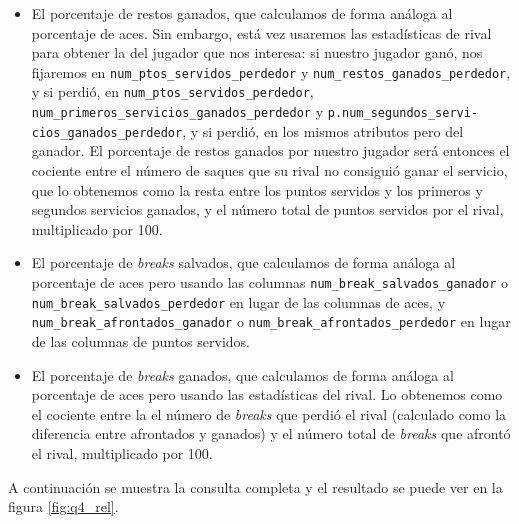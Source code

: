 \documentclass[11pt]{opticajnl}
\begin{document}
\begin{itemize}
\item El porcentaje de restos ganados, que calculamos de forma análoga al porcentaje de aces. Sin embargo, está vez usaremos las estadísticas de rival para obtener la del jugador que nos interesa: si nuestro jugador ganó, nos fijaremos en \texttt{num\_ptos\_servidos\_perdedor} y \texttt{num\_restos\_ganados\_perdedor}, y si perdió, en \texttt{num\_ptos\_servidos\_perdedor}, \texttt{num\_primeros\_servicios\_ganados\_perdedor} y \texttt{p.num\_segundos\_servi-} \\ \texttt{cios\_ganados\_perdedor}, y si perdió, en los mismos atributos pero del ganador. El porcentaje de restos ganados por nuestro jugador será entonces el cociente entre el número de saques que su rival no consiguió ganar el servicio, que lo obtenemos como la resta entre los puntos servidos y los primeros y segundos servicios ganados, y el número total de puntos servidos por el rival, multiplicado por 100.
\item El porcentaje de \textit{breaks} salvados, que calculamos de forma análoga al porcentaje de aces pero usando las columnas \texttt{num\_break\_salvados\_ganador} o \texttt{num\_break\_salvados\_perdedor} en lugar de las columnas de aces, y \texttt{num\_break\_afrontados\_ganador} o \texttt{num\_break\_afrontados\_perdedor} en lugar de las columnas de puntos servidos.
\item El porcentaje de \textit{breaks} ganados, que calculamos de forma análoga al porcentaje de aces pero usando las estadísticas del rival. Lo obtenemos como el cociente entre la el número de \textit{breaks} que perdió el rival (calculado como la diferencia entre afrontados y ganados) y el número total de \textit{breaks} que afrontó el rival, multiplicado por 100.
\end{itemize}

\noindent A continuación se muestra la consulta completa y el resultado se puede ver en la figura \ref{fig:q4_rel}.
\end{document}
